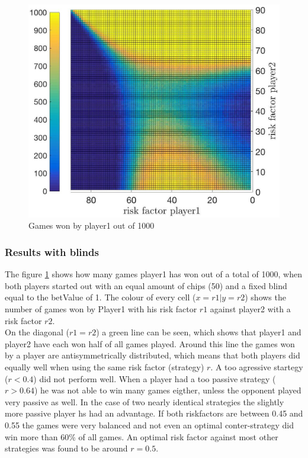 \documentclass[11pt]{article}
\begin{document}
\begin{figure}
\begin{center}
\includegraphics[scale=0.2]{Graphics/allDataPlot_BlindOn_1000Games_001Step_TopFlat.jpg}
\caption{Games won by player1 out of 1000\label{Topview of all Data}}
\end{center}
\end{figure}

\subsubsection{Results with blinds}
The figure \ref{Topview of all Data} shows how many games player1 has won out of a total of 1000, when both players started out with an equal amount of chips (50) and a fixed blind equal to the betValue of 1. The colour of every cell ($x=r1|y=r2$) shows the number of games won by Player1 with his risk factor $r1$ against player2 with a risk factor $r2$.\\
On the diagonal ($r1=r2$) a green line can be seen, which shows that player1 and player2 have each won half of all games played. Around this line the games won by a player are antisymmetrically distributed, which means that both players did equally well when using the same risk factor (strategy) $r$.
A too agressive startegy ($r < 0.4$) did not perform well. When a player had a too passive strategy ($r > 0.64$) he was not able to win many games eigther, unless the opponent played very passive as well. In the case of two nearly identical strategies the slightly more passive player hs had an advantage.
If both riskfactors are between 0.45 and 0.55 the games were very balanced and not even an optimal conter-strategy did win more than 60\% of all games. An optimal risk factor against most other strategies was found to be around $r=0.5$. \\
\end{document}
